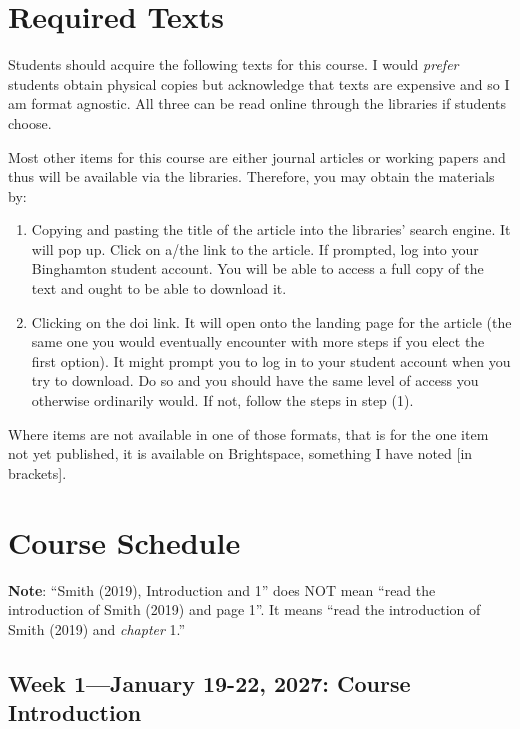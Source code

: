 \documentclass[12pt]{article}
\begin{document}
\section*{Required Texts}

\par{Students should acquire the following texts for this course. I would \textit{prefer} students obtain physical copies but acknowledge that texts are expensive and so I am format agnostic. All three can be read online through the libraries if students choose.




Most other items for this course are either journal articles or working papers and thus will be available via the libraries. Therefore, you may obtain the materials by:}
\begin{enumerate}
    \item Copying and pasting the title of the article into the libraries' search engine. It will pop up. Click on a/the link to the article. If prompted, log into your Binghamton student account. You will be able to access a full copy of the text and ought to be able to download it.
    \item Clicking on the doi link. It will open onto the landing page for the article (the same one you would eventually encounter with more steps if you elect the first option). It might prompt you to log in to your student account when you try to download. Do so and you should have the same level of access you otherwise ordinarily would. If not, follow the steps in step (1).
\end{enumerate}

Where items are not available in one of those formats, that is for the one item not yet published, it is available on Brightspace, something I have noted [in brackets].

\section*{Course Schedule}

\textbf{Note}: ``Smith (2019), Introduction and 1'' does NOT mean ``read the introduction of Smith (2019) and page 1''. It means ``read the introduction of Smith (2019) and \textit{chapter} 1.''

\subsection*{Week 1---January 19-22, 2027: Course Introduction}
\end{document}

